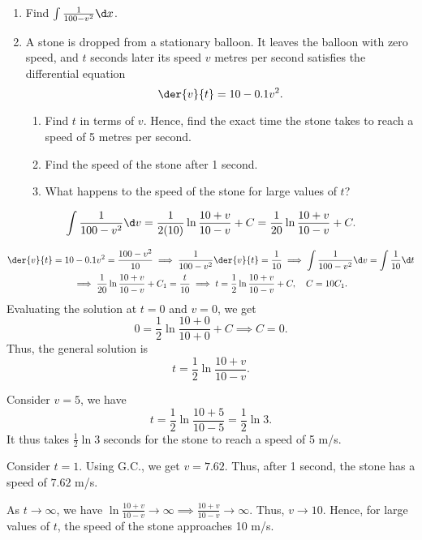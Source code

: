 \begin{problem}
    \begin{enumerate}
        \item Find $\int \frac1{100-v^2} \d x$.
        \item A stone is dropped from a stationary balloon. It leaves the balloon with zero speed, and $t$ seconds later its speed $v$ metres per second satisfies the differential equation \[\der{v}{t} = 10 - 0.1v^2.\]
        \begin{enumerate}
            \item Find $t$ in terms of $v$. Hence, find the exact time the stone takes to reach a speed of 5 metres per second.
            \item Find the speed of the stone after 1 second.
            \item What happens to the speed of the stone for large values of $t$?
        \end{enumerate}
    \end{enumerate}
\end{problem}
\begin{solution}
    \begin{ppart}
        \[\int \frac1{100 - v^2} \d v = \frac{1}{2(10)} \ln{\frac{10 + v}{10 - v}} + C = \frac{1}{20} \ln{\frac{10 + v}{10 - v}} + C.\]
    \end{ppart}
    \begin{ppart}
        \begin{psubpart}
            \begin{gather*}
                \der{v}{t} = 10 - 0.1v^2 = \frac{100 - v^2}{10} \implies \frac1{100 - v^2} \der{v}{t} = \frac1{10} \implies \int \frac1{100 - v^2} \d v = \int \frac1{10} \d t\\
                \implies \frac1{20} \ln{\frac{10 + v}{10 - v}} + C_1 = \frac{t}{10} \implies t = \frac1{2} \ln{\frac{10 + v}{10 - v}} + C, \quad C = 10 C_1.
            \end{gather*}
            Evaluating the solution at $t = 0$ and $v = 0$, we get \[0 = \frac12 \ln{\frac{10 +0}{10 + 0}} + C \implies C = 0.\] Thus, the general solution is \[t = \frac12 \ln{\frac{10 + v}{10 - v}}.\]

            Consider $v = 5$, we have \[t = \frac12 \ln{\frac{10+5}{10 - 5}} = \frac12 \ln 3.\] It thus takes $\frac12 \ln 3$ seconds for the stone to reach a speed of 5 m/s.
        \end{psubpart}
        \begin{psubpart}
            Consider $t = 1$. Using G.C., we get $v = 7.62$. Thus, after 1 second, the stone has a speed of $7.62$ m/s.
        \end{psubpart}
        \begin{psubpart}
            As $t \to \infty$, we have $\ln{\frac{10 + v}{10 - v}} \to \infty \implies \frac{10 + v}{10 - v} \to \infty$. Thus, $v \to 10$. Hence, for large values of $t$, the speed of the stone approaches 10 m/s.
        \end{psubpart}
    \end{ppart}
\end{solution}

